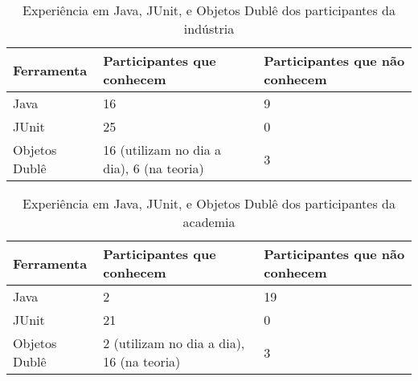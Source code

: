 \begin{table}
	\begin{tabular}{ | p{5cm} | p{5cm} | p{5cm} | }
		\hline
		Ferramenta & Participantes que conhecem & Participantes que não conhecem\\
		\hline
		Java & 16 & 9\\
		JUnit & 25 & 0\\
		Objetos Dublê & 16 (utilizam no dia a dia), 6 (na teoria) & 3\\
		\hline
	\end{tabular}
	\caption{Experiência em Java, JUnit, e Objetos Dublê dos participantes da indústria}
	\label{tab:exp-industria}
\end{table}

\begin{table}
	\begin{tabular}{ | p{5cm} | p{5cm} | p{5cm} | }
		\hline
		Ferramenta & Participantes que conhecem & Participantes que não conhecem\\
		\hline
		Java & 2 & 19\\
		JUnit & 21 & 0\\
		Objetos Dublê & 2 (utilizam no dia a dia), 16 (na teoria) & 3\\
		\hline
	\end{tabular}
	\caption{Experiência em Java, JUnit, e Objetos Dublê dos participantes da academia}
	\label{tab:exp-academia}
\end{table}